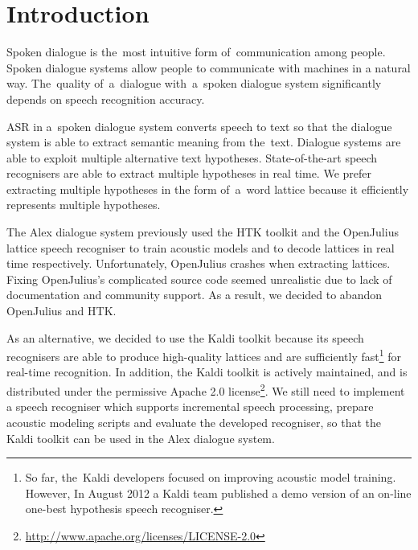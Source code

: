 \chapter{Introduction}
\label{cha:intro}

Spoken dialogue is the~most intuitive form of~communication among people. 
Spoken dialogue systems allow people to communicate with machines in a natural way.
The~quality of~a~dialogue with~a~spoken dialogue system significantly depends on speech recognition accuracy. 


\acf{ASR} in a~spoken dialogue system converts speech to text so that the dialogue system is able to extract semantic meaning from the~text.
Dialogue systems are able to exploit multiple alternative text hypotheses.
State-of-the-art speech recognisers are able to extract multiple hypotheses in real time.
We prefer extracting multiple hypotheses in the form of~a~word lattice because it efficiently represents multiple hypotheses.

The Alex dialogue system previously used the \ac{HTK} toolkit \cite{young94htk} and the OpenJulius \cite{lee2009julius} lattice speech recogniser to train acoustic models and to decode lattices in real time respectively. 
Unfortunately, OpenJulius crashes when extracting lattices.
Fixing OpenJulius's complicated source code seemed unrealistic due to lack of documentation and community support.
As a result, we decided to abandon OpenJulius and \ac{HTK}.

As an alternative, we decided to use the Kaldi toolkit \cite{povey2011kaldi} because its speech recognisers are able to produce high-quality lattices and are sufficiently fast\footnote{So far, the~Kaldi developers focused on improving acoustic model training. 
    However, In August 2012 a Kaldi team published a demo version of an on-line one-best hypothesis speech recogniser.} 
for real-time recognition.\cite{povey2012generating}
In addition, the Kaldi toolkit is actively maintained, and is distributed under the permissive Apache 2.0 license\footnote{\url{http://www.apache.org/licenses/LICENSE-2.0}}.
We still need to implement a speech recogniser which supports incremental speech processing, prepare acoustic modeling scripts and evaluate the developed recogniser, so that the Kaldi toolkit can be used in the Alex dialogue system.

